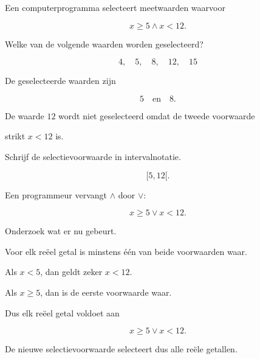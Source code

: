 \documentclass{ximera}
\begin{document}
\begin{oefening}{\oefU \ESS}

Een computerprogramma selecteert meetwaarden waarvoor

\[
x\geq5\land x<12.
\]

\begin{question}

Welke van de volgende waarden worden geselecteerd?

\[
4,\quad5,\quad8,\quad12,\quad15
\]

\begin{oplossing}

De geselecteerde waarden zijn

\[
5\quad\text{en}\quad8.
\]

De waarde $12$ wordt niet geselecteerd omdat de tweede voorwaarde

strikt $x<12$ is.

\end{oplossing}

\end{question}



\begin{question}

Schrijf de selectievoorwaarde in intervalnotatie.

\begin{oplossing}

\[
[5,12[.
\]

\end{oplossing}

\end{question}



\begin{question}

Een programmeur vervangt $\land$ door $\lor$:

\[
x\geq5\lor x<12.
\]

Onderzoek wat er nu gebeurt.

\begin{oplossing}

Voor elk reëel getal is minstens één van beide voorwaarden waar.

Als $x<5$, dan geldt zeker $x<12$.

Als $x\geq5$, dan is de eerste voorwaarde waar.

Dus elk reëel getal voldoet aan

\[
x\geq5\lor x<12.
\]

De nieuwe selectievoorwaarde selecteert dus alle reële getallen.

\end{oplossing}

\end{question}

\end{oefening}
\end{document}
